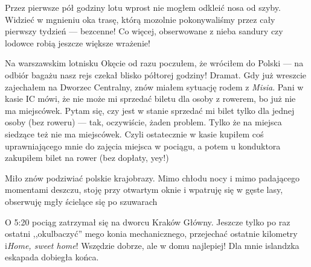 Przez pierwsze pół godziny lotu wprost nie mogłem odkleić nosa od szyby. Widzieć w mgnieniu oka trasę, którą mozolnie pokonywaliśmy przez cały pierwszy tydzień --- bezcenne! Co więcej, obserwowane z nieba sandury czy lodowce robią jeszcze większe wrażenie!

Na warszawskim lotnisku Okęcie od razu poczułem, że wróciłem do Polski --- na odbiór bagażu nasz rejs czekał blisko półtorej godziny! Dramat. Gdy już wreszcie zajechałem na Dworzec Centralny, znów miałem sytuację rodem z \emph{Misia}. Pani w kasie IC mówi, że nie może mi sprzedać biletu dla osoby z rowerem, bo już nie ma miejscówek. Pytam się, czy jest w stanie sprzedać mi bilet tylko dla jednej osoby (bez roweru) --- tak, oczywiście, żaden problem. Tylko że na miejsca siedzące też nie ma miejscówek. Czyli ostatecznie w kasie kupiłem coś uprawniającego mnie do zajęcia miejsca w pociągu, a potem u konduktora zakupiłem bilet na rower (bez dopłaty, yey!)

Miło znów podziwiać polskie krajobrazy. Mimo chłodu nocy i mimo padającego momentami deszczu, stoję przy otwartym oknie i wpatruję się w gęste lasy, obserwuję mgły ścielące się po szuwarach\textellipsis

O 5:20 pociąg zatrzymał się na dworcu Kraków Główny. Jeszcze tylko po raz ostatni ,,okulbaczyć'' mego konia mechanicznego, przejechać ostatnie kilometry i\textellipsis \emph{Home, sweet home}! Wszędzie dobrze, ale w domu najlepiej! Dla mnie islandzka eskapada dobiegła końca.

